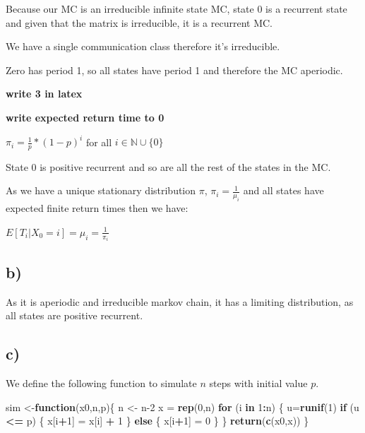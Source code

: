 \documentclass[]{article}
\newenvironment{Shaded}{\begin{snugshade}}{\end{snugshade}}
\newcommand{\ControlFlowTok}[1]{\textcolor[rgb]{0.13,0.29,0.53}{\textbf{#1}}}
\newcommand{\DecValTok}[1]{\textcolor[rgb]{0.00,0.00,0.81}{#1}}
\newcommand{\KeywordTok}[1]{\textcolor[rgb]{0.13,0.29,0.53}{\textbf{#1}}}
\newcommand{\NormalTok}[1]{#1}
\newcommand{\OperatorTok}[1]{\textcolor[rgb]{0.81,0.36,0.00}{\textbf{#1}}}
\newcommand{\StringTok}[1]{\textcolor[rgb]{0.31,0.60,0.02}{#1}}
\begin{document}
Because our MC is an irreducible infinite state MC, state 0 is a
recurrent state and given that the matrix is irreducible, it is a
recurrent MC.

We have a single communication class therefore it's irreducible.

Zero has period 1, so all states have period 1 and therefore the MC
aperiodic.

\textbf{write 3 in latex}

\textbf{write expected return time to 0}

\(\pi_{i} = \frac{1}{p} * (1-p)^{i}\) for all
\(i \in \mathbb{N} \cup \{0\}\)

State 0 is positive recurrent and so are all the rest of the states in
the MC.

As we have a unique stationary distribution \(\pi\),
\(\pi_{i} = \frac{1}{\mu_{i}}\) and all states have expected finite
return times then we have:

\(E[T_{i}|X_{0} = i] = \mu_{i} = \frac{1}{\pi_{i}}\)

\newpage

\hypertarget{b-1}{%
\subsection{b)}\label{b-1}}

As it is aperiodic and irreducible markov chain, it has a limiting
distribution, as all states are positive recurrent.

\hypertarget{c-1}{%
\subsection{c)}\label{c-1}}

We define the following function to simulate \(n\) steps with initial
value \(p\).

\begin{Shaded}
\begin{Highlighting}[]
\NormalTok{sim <-}\ControlFlowTok{function}\NormalTok{(x0,n,p)\{ }
\NormalTok{    n <-}\StringTok{ }\NormalTok{n}\DecValTok{-2}
\NormalTok{    x =}\StringTok{ }\KeywordTok{rep}\NormalTok{(}\DecValTok{0}\NormalTok{,n)}
    \ControlFlowTok{for}\NormalTok{ (i }\ControlFlowTok{in} \DecValTok{1}\OperatorTok{:}\NormalTok{n) \{}
\NormalTok{        u=}\KeywordTok{runif}\NormalTok{(}\DecValTok{1}\NormalTok{) }
        \ControlFlowTok{if}\NormalTok{ (u }\OperatorTok{<=}\StringTok{ }\NormalTok{p) \{}
\NormalTok{            x[i}\OperatorTok{+}\DecValTok{1}\NormalTok{] =}\StringTok{ }\NormalTok{x[i] }\OperatorTok{+}\StringTok{ }\DecValTok{1}
\NormalTok{        \} }\ControlFlowTok{else}\NormalTok{ \{}
\NormalTok{            x[i}\OperatorTok{+}\DecValTok{1}\NormalTok{] =}\StringTok{ }\DecValTok{0}
\NormalTok{        \}}
\NormalTok{    \} }
    \KeywordTok{return}\NormalTok{(}\KeywordTok{c}\NormalTok{(x0,x))}
\NormalTok{\}}
\end{Highlighting}
\end{Shaded}
\end{document}
